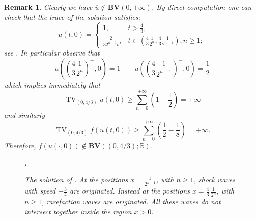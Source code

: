 \documentclass[a4paper, 10pt, final]{article}
\newtheorem{remark}{Remark}[section]
\newcommand{\R}{\mathbb{R}} \newcommand{\N}{\mathbb{N}}
\DeclareMathOperator{\tv}{TV}
\begin{document}
\begin{remark}
  Clearly we have  $ \overline u\not\in \mathbf{BV}(0, +\infty)$. By direct computation one can check that the trace of the solution satisfies:
  \[
    u(t, 0)=
    \begin{cases}
      1, & t>\frac{4}{3},\\
      \frac{2}{3 2^{n-1} t}, & t\in \left(\frac{4}{3}
      \frac{1}{2^n}, \frac{4}{3}\frac{1}{2^{n-1}}\right), 
      n\geq 1;
    \end{cases}
  \]
  see .
  In particular observe that
  \[u\left(\left(\frac{4}{3}
  \frac{1}{2^n}\right)^+, 0\right)=1\qquad u\left(\left(\frac{4}{3}
  \frac{1}{2^{n-1}}\right)^-, 0\right)=\frac{1}{2}\]
  which implies immediately that 
  \[
    \tv_{(0,4/3)} u(t,0)\geq\sum_{n=0}^{+\infty} \left(1-\frac{1}{2}\right)=+\infty 
  \] 
  and similarly 
  \[
    \tv_{(0,4/3)} f(u(t,0))\geq\sum_{n=0}^{+\infty} \left(\frac{1}{2}-\frac{1}{8}\right)=+\infty. 
  \] 
  Therefore, $f(u(\cdot, 0))\not\in \mathbf{BV}((0,4/3); \R)$.

  \begin{figure}
    \centering
    \caption{The solution of . 
      At the positions $x = \frac{1}{2^{n-1}}$,
      with $n \ge 1$, shock waves with speed $-\frac{3}{4}$ are originated.
      Instead at the positions $x = \frac{4}{3}\, \frac{1}{2^{n}}$,
      with $n \ge 1$, rarefaction waves are originated.
      All these waves do not intersect together inside the region $x>0$.}
    \label{fig:ex-appendice}.
  \end{figure}
\end{remark}
 
\end{document}
